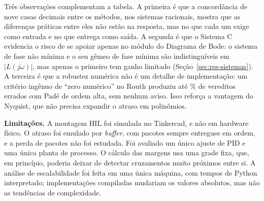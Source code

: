 Três observações complementam a tabela. A primeira é que a concordância de nove casas decimais entre os métodos, nos sistemas racionais, mostra que as diferenças práticas entre eles não estão na resposta, mas no que cada um exige como entrada e no que entrega como saída. A segunda é que o Sistema C evidencia o risco de se apoiar apenas no módulo do Diagrama de Bode: o sistema de fase não mínima e o seu gêmeo de fase mínima são indistinguíveis em $|L(j\omega)|$, mas apenas o primeiro tem ganho limitado (Seção~\ref{sec:res-sistemas}). A terceira é que a robustez numérica não é um detalhe de implementação: um critério ingênuo de ``zero numérico'' no Routh produziu até \RobAbsErro\% de vereditos errados com Padé de ordem alta, sem nenhum aviso. Isso reforça a vantagem do Nyquist, que não precisa expandir o atraso em polinômios.

\textbf{Limitações.} A montagem HIL foi simulada no Tinkercad, e não em hardware físico. O atraso foi emulado por \textit{buffer}, com pacotes sempre entregues em ordem, e a perda de pacotes não foi estudada. Foi avaliado um único ajuste de PID e uma única planta de processo. O cálculo das margens usa uma grade fixa, que, em princípio, poderia deixar de detectar cruzamentos muito próximos entre si. A análise de escalabilidade foi feita em uma única máquina, com tempos de Python interpretado; implementações compiladas mudariam os valores absolutos, mas não as tendências de complexidade.
